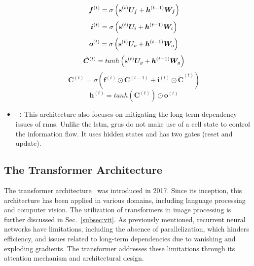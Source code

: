 \begin{itemize}
    \begin{equation}
        \bm{f}^{(t)} = \sigma \left( \mathbf{s}^{(t)}\bm{U}_f + \bm{h}^{(t-1)}\bm{W}_f \right)
        \label{eq:lstm_first}
    \end{equation}
    \begin{equation}
        \bm{i}^{(t)} = \sigma \left( \mathbf{s}^{(t)}\bm{U}_i + \bm{h}^{(t-1)}\bm{W}_i\right)
    \end{equation}
    \begin{equation}
        \bm{o}^{(t)} = \sigma \left( \mathbf{s}^{(t)}\bm{U}_o + \bm{h}^{(t-1)}\bm{W}_o\right)
    \end{equation}
    \begin{equation}
        \tilde{\bm{C}}^{(t)} = tanh \left( \mathbf{s}^{(t)}\bm{U}_g + \bm{h}^{(t-1)}\bm{W}_g\right)
    \end{equation}
    \begin{equation}
        \bm{C}^{(t)} = \sigma \left( \bm{f}^{(t)} \odot \bm{C}^{(t-1)} + \bm{i}^{(t)} \odot \tilde{\bm{C}}^{(t)}\right)
    \end{equation}
    \begin{equation}
        \bm{h}^{(t)} = tanh \left( \bm{C}^{(t)}\right) \odot \bm{o}^{(t)}
        \label{eq:lstm_last}
    \end{equation}

    
    \item \textbf{~\cite{cho2014learning}:} This architecture also focuses on mitigating the long-term dependency issues of \glspl{rnn}. Unlike the \gls{lstm}, \glspl{gru} do not make use of a cell state to control the information flow. It uses hidden states and has two gates (reset and update). 


\end{itemize}



\subsection{The Transformer Architecture}
\label{sec:transformer}

The transformer architecture~\cite{vaswani2017attention} was introduced in 2017. Since its inception, this architecture has been applied in various domains, including language processing and computer vision. The utilization of transformers in image processing is further discussed in Sec.~\ref{subsec:vit}. As previously mentioned, recurrent neural networks have limitations, including the absence of parallelization, which hinders efficiency, and issues related to long-term dependencies due to vanishing and exploding gradients. The transformer addresses these limitations through its attention mechanism and architectural design.


